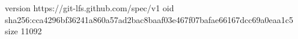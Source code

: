 version https://git-lfs.github.com/spec/v1
oid sha256:cca4296bf36241a860a57ad2bac8baaf03e467f07bafae66167dcc69a0eaa1c5
size 11092

